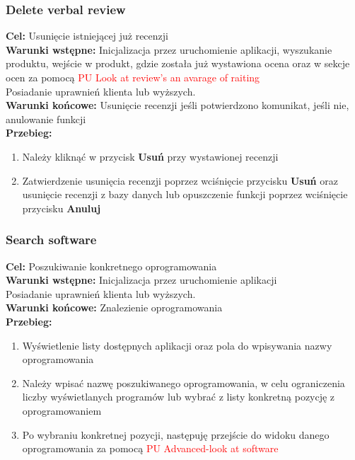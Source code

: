 \documentclass[12pt,a4paper]{article}
\begin{document}
\subsubsection{Delete verbal review}
\textbf{Cel: } Usunięcie istniejącej już recenzji \\
\textbf{Warunki wstępne:} Inicjalizacja przez uruchomienie aplikacji,  wyszukanie produktu, wejście w produkt, gdzie została już wystawiona ocena oraz w sekcje ocen za pomocą \textcolor{red}{PU Look at review's an avarage of raiting}\\ Posiadanie uprawnień klienta lub wyższych.\\
\textbf{Warunki końcowe:} Usunięcie recenzji jeśli potwierdzono komunikat, jeśli nie, anulowanie funkcji\\
\textbf{Przebieg:}
\begin{enumerate}
    \item Należy kliknąć w przycisk \textbf{Usuń} przy wystawionej recenzji
    \item Zatwierdzenie usunięcia recenzji poprzez wciśnięcie przycisku \textbf{Usuń} oraz usunięcie recenzji z bazy danych lub opuszczenie funkcji poprzez wciśnięcie przycisku \textbf{Anuluj}
\end{enumerate}

\subsubsection{Search software}
\textbf{Cel: } Poszukiwanie konkretnego oprogramowania \\
\textbf{Warunki wstępne:} Inicjalizacja przez uruchomienie aplikacji\\ Posiadanie uprawnień klienta lub wyższych.\\
\textbf{Warunki końcowe:} Znalezienie oprogramowania\\
\textbf{Przebieg:}
\begin{enumerate}
    \item Wyświetlenie listy dostępnych aplikacji oraz pola do wpisywania nazwy oprogramowania
    \item Należy wpisać nazwę poszukiwanego oprogramowania, w celu ograniczenia liczby wyświetlanych programów lub wybrać z listy konkretną pozycję z oprogramowaniem
    \item Po wybraniu konkretnej pozycji, następuję przejście do widoku danego oprogramowania za pomocą \textcolor{red}{PU Advanced-look at software}
\end{enumerate}
\end{document}
